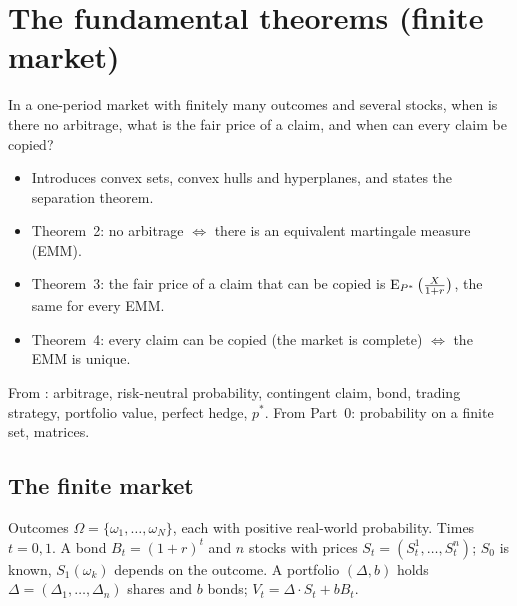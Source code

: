 \chapter{The fundamental theorems (finite market)}
\label{ch:fundamental}

\begin{question}
In a one-period market with finitely many outcomes and several stocks, when is there no arbitrage, what is the fair price of a claim, and when can every claim be copied?
\end{question}

\begin{whatfor}
\begin{itemize}
  \item Introduces convex sets, convex hulls and hyperplanes, and states the separation theorem.
  \item Theorem~2: no arbitrage $\iff$ there is an equivalent martingale measure (EMM).
  \item Theorem~3: the fair price of a claim that can be copied is $\operatorname{E}_{P^*}\big(\frac{X}{1+r}\big)$, the same for every EMM.
  \item Theorem~4: every claim can be copied (the market is complete) $\iff$ the EMM is unique.
\end{itemize}
\end{whatfor}

\begin{prereq}
From : arbitrage, risk-neutral probability, contingent claim, bond, trading strategy, portfolio value, perfect hedge, $p^*$. From Part~0: probability on a finite set, matrices.
\end{prereq}

\section{The finite market}

\begin{setup}
Outcomes $\Omega=\{\omega_1,\dots,\omega_N\}$, each with positive real-world probability. Times $t=0,1$. A bond $B_t=(1+r)^t$ and $n$ stocks with prices $S_t=(S_t^1,\dots,S_t^n)$; $S_0$ is known, $S_1(\omega_k)$ depends on the outcome. A portfolio $(\Delta,b)$ holds $\Delta=(\Delta_1,\dots,\Delta_n)$ shares and $b$ bonds; $V_t=\Delta\cdot S_t+bB_t$.
\end{setup}

